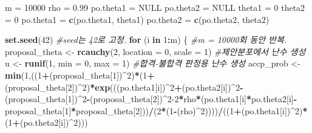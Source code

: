 \documentclass[
]{article}
\newenvironment{Shaded}{\begin{snugshade}}{\end{snugshade}}
\newcommand{\AttributeTok}[1]{\textcolor[rgb]{0.13,0.29,0.53}{#1}}
\newcommand{\CommentTok}[1]{\textcolor[rgb]{0.56,0.35,0.01}{\textit{#1}}}
\newcommand{\ConstantTok}[1]{\textcolor[rgb]{0.56,0.35,0.01}{#1}}
\newcommand{\ControlFlowTok}[1]{\textcolor[rgb]{0.13,0.29,0.53}{\textbf{#1}}}
\newcommand{\DecValTok}[1]{\textcolor[rgb]{0.00,0.00,0.81}{#1}}
\newcommand{\FloatTok}[1]{\textcolor[rgb]{0.00,0.00,0.81}{#1}}
\newcommand{\FunctionTok}[1]{\textcolor[rgb]{0.13,0.29,0.53}{\textbf{#1}}}
\newcommand{\NormalTok}[1]{#1}
\newcommand{\OtherTok}[1]{\textcolor[rgb]{0.56,0.35,0.01}{#1}}
\newcommand{\SpecialCharTok}[1]{\textcolor[rgb]{0.81,0.36,0.00}{\textbf{#1}}}
\begin{document}
\begin{Shaded}
\begin{Highlighting}[]
\NormalTok{m }\OtherTok{=} \DecValTok{10000}
\NormalTok{rho }\OtherTok{=} \FloatTok{0.99}
\NormalTok{po.theta1 }\OtherTok{=} \ConstantTok{NULL}
\NormalTok{po.theta2 }\OtherTok{=} \ConstantTok{NULL}
\NormalTok{theta1 }\OtherTok{=} \DecValTok{0}
\NormalTok{theta2 }\OtherTok{=} \DecValTok{0}
\NormalTok{po.theta1 }\OtherTok{=} \FunctionTok{c}\NormalTok{(po.theta1, theta1)}
\NormalTok{po.theta2 }\OtherTok{=} \FunctionTok{c}\NormalTok{(po.theta2, theta2) }

\FunctionTok{set.seed}\NormalTok{(}\DecValTok{42}\NormalTok{) }\CommentTok{\#seed는 42로 고정.}
\ControlFlowTok{for}\NormalTok{ (i }\ControlFlowTok{in} \DecValTok{1}\SpecialCharTok{:}\NormalTok{m) \{ }\CommentTok{\#m = 10000회 동안 반복.}
\NormalTok{  proposal\_theta }\OtherTok{\textless{}{-}} \FunctionTok{rcauchy}\NormalTok{(}\DecValTok{2}\NormalTok{, }\AttributeTok{location =} \DecValTok{0}\NormalTok{, }\AttributeTok{scale =} \DecValTok{1}\NormalTok{) }\CommentTok{\#제안분포에서 난수 생성}
\NormalTok{  u }\OtherTok{\textless{}{-}} \FunctionTok{runif}\NormalTok{(}\DecValTok{1}\NormalTok{, }\AttributeTok{min =} \DecValTok{0}\NormalTok{, }\AttributeTok{max =} \DecValTok{1}\NormalTok{) }\CommentTok{\#합격{-}불합격 판정용 난수 생성}
\NormalTok{  accp\_prob }\OtherTok{\textless{}{-}} \FunctionTok{min}\NormalTok{(}\DecValTok{1}\NormalTok{,((}\DecValTok{1}\SpecialCharTok{+}\NormalTok{(proposal\_theta[}\DecValTok{1}\NormalTok{])}\SpecialCharTok{\^{}}\DecValTok{2}\NormalTok{)}\SpecialCharTok{*}\NormalTok{(}\DecValTok{1}\SpecialCharTok{+}\NormalTok{(proposal\_theta[}\DecValTok{2}\NormalTok{])}\SpecialCharTok{\^{}}\DecValTok{2}\NormalTok{)}\SpecialCharTok{*}\FunctionTok{exp}\NormalTok{(((po.theta1[i])}\SpecialCharTok{\^{}}\DecValTok{2}\SpecialCharTok{+}\NormalTok{(po.theta2[i])}\SpecialCharTok{\^{}}\DecValTok{2}\SpecialCharTok{{-}}\NormalTok{(proposal\_theta[}\DecValTok{1}\NormalTok{])}\SpecialCharTok{\^{}}\DecValTok{2}\SpecialCharTok{{-}}\NormalTok{(proposal\_theta[}\DecValTok{2}\NormalTok{])}\SpecialCharTok{\^{}}\DecValTok{2{-}2}\SpecialCharTok{*}\NormalTok{rho}\SpecialCharTok{*}\NormalTok{(po.theta1[i]}\SpecialCharTok{*}\NormalTok{po.theta2[i]}\SpecialCharTok{{-}}\NormalTok{proposal\_theta[}\DecValTok{1}\NormalTok{]}\SpecialCharTok{*}\NormalTok{proposal\_theta[}\DecValTok{2}\NormalTok{]))}\SpecialCharTok{/}\NormalTok{(}\DecValTok{2}\SpecialCharTok{*}\NormalTok{(}\DecValTok{1}\SpecialCharTok{{-}}\NormalTok{(rho)}\SpecialCharTok{\^{}}\DecValTok{2}\NormalTok{))))}\SpecialCharTok{/}\NormalTok{((}\DecValTok{1}\SpecialCharTok{+}\NormalTok{(po.theta1[i])}\SpecialCharTok{\^{}}\DecValTok{2}\NormalTok{)}\SpecialCharTok{*}\NormalTok{(}\DecValTok{1}\SpecialCharTok{+}\NormalTok{(po.theta2[i])}\SpecialCharTok{\^{}}\DecValTok{2}\NormalTok{)))}

\end{Highlighting}
\end{Shaded}
\end{document}
